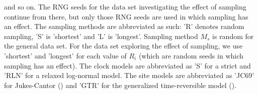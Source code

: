 \begin{table}
{    and so on.  
    The RNG seeds for the data set investigating the effect 
    of sampling continue from there, but only those RNG seeds are used in which sampling has an effect.
    The sampling methods are abbreviated as such: 'R' denotes random
    sampling, 'S' is 'shortest' and 'L' is 'longest'. Sampling method $M_s$ is random for the general
    data set. For the data set exploring the effect of sampling, we use 'shortest'
    and 'longest' for each value of $R_i$ (which are random seeds in which sampling has an effect).
    The clock models are abbreviated as 'S' for a strict and 'RLN' for a relaxed log-normal model.
    The site models are abbreviated as 'JC69' for Jukes-Cantor (\cite{jc69}) and 'GTR' for the generalized 
    time-reversible model (\cite{gtr}).
  }
  \label{table:parameters}
\end{table}



